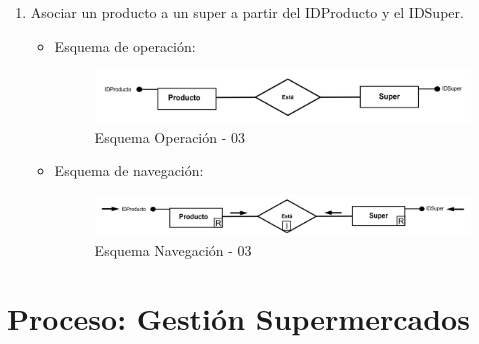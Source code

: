 \documentclass[a4paper,12pt]{report}
\begin{document}
\begin{enumerate}
\item Asociar un producto a un super a partir del IDProducto y el IDSuper.
\begin{itemize}
\item Esquema de operación:
\begin{figure}[!htp]
\centering
\includegraphics[width=0.9\linewidth]{./operaciones/img/Productos/03_ope.png}
\caption{Esquema Operación - 03}
\label{fig:ope03}
\medskip
\footnotesize
{}
\end{figure}
\item Esquema de navegación:
\begin{figure}[!htp]
\centering
\includegraphics[width=0.9\linewidth]{./operaciones/img/Productos/03_nav.png}
\caption{Esquema Navegación - 03}
\label{fig:nave02}
\medskip
\footnotesize
{}
\end{figure}
\end{itemize}
\end{enumerate}
\section{Proceso: Gestión Supermercados}
\label{sec-7-3}
\end{document}
